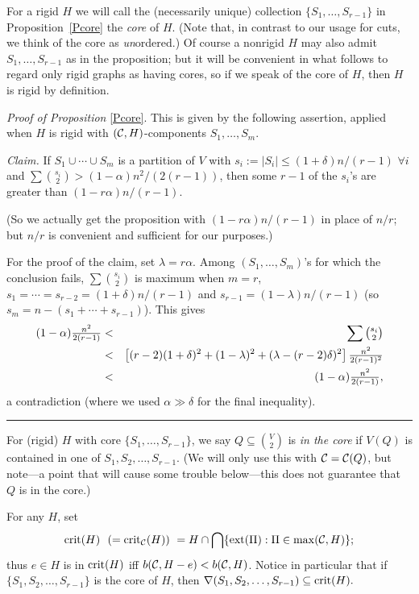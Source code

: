 \documentclass[letterpaper,11pt]{article}
\newcommand{\beq}[1]{\begin{equation}\label{#1}}
\newcommand{\enq}[0]{\end{equation}}
\newcommand{\mn}[0]{\medskip\noindent}
\newcommand{\sub}[0]{\subseteq}
\renewcommand{\dots}[0]{,\ldots,}
\newcommand{\cee}[0]{{\cal C}}
\newcommand{\crit}[0]{{\rm crit}}
\newcommand{\ext}[0]{{\rm ext}}
\newcommand{\0}[0]{\emptyset}
\renewcommand{\qed}[0]{\begin{flushright} \rule{2mm}{3mm} \end{flushright}}
\newcommand{\C}[2]{{{#1}\choose{{#2}}}}
\newcommand{\Cc}[0]{\tbinom}
\newcommand{\ga}[0]{\alpha }
\newcommand{\gd}[0]{\delta }
\newcommand{\gl}[0]{\lambda }
\begin{document}
For a rigid $H$ we will call the (necessarily unique)
collection $\{S_1\dots S_{r-1}\}$ in Proposition~\ref{Pcore}
the {\em core} of $H$.
(Note that, in contrast to our usage for cuts, we
think of the core as {\em un}ordered.)
Of course a nonrigid $H$ may also admit
$S_1\dots S_{r-1}$ as in the proposition; but it
will be convenient in what follows to regard only rigid graphs
as having cores, so if we speak of the core of $H$,
then $H$ is rigid by definition.

\mn
{\em Proof of Proposition} \ref{Pcore}.
This is given by the following assertion,
applied when $H$ is rigid with $(\cee,H)$-components
$S_1\dots S_m$.
%

\mn
{\em Claim.}
If $S_1\cup\cdots\cup S_m$ is a partition of $V$
with $s_i:=|S_i|\leq (1+\gd)n/(r-1)$ $\forall i$ and
$\sum\C{s_i}{2} > (1-\ga)n^2/(2(r-1))$, then
some $r-1$ of the $s_i$'s are greater than
$(1-r\ga)n/(r-1)$.

\mn
(So we actually get
the proposition with $(1-r\ga)n/(r-1)$ in place of $n/r$;
but $n/r$ is convenient and
sufficient for our purposes.)

\medskip
For the proof of the claim, set $\gl=r\ga$.
Among $(S_1\dots S_m)$'s for which
the conclusion fails,
$\sum\C{s_i}{2}$ is maximum when $m=r$,
$s_1=\cdots =s_{r-2}=(1+\gd)n/(r-1)$ and
$s_{r-1}=(1-\gl)n/(r-1)$ (so $s_m= n-(s_1+\cdots +s_{r-1})$).
This gives
\begin{eqnarray*}
(1-\ga)\tfrac{n^2}{2(r-1)} &<&\sum\Cc{s_i}{2}\\
&<& \left[(r-2)(1+\gd)^2 + (1-\gl)^2 + (\gl-(r-2)\gd)^2\right]
\tfrac{n^2}{2(r-1)^2}\\
&<& (1-\ga)
\tfrac{n^2}{2(r-1)},
\end{eqnarray*}
a contradiction
(where we used $\ga \gg \gd$
for the final inequality).\qed


For (rigid) $H$ with core $\{S_1\dots S_{r-1}\}$,
we say $Q\sub \C{V}{2}$ is {\em in the core}
if $V(Q)$ is contained in
one of $S_1,S_2,\ldots, S_{r-1}$.
(We will only use this with $\cee=\cee(Q)$, but note---a
point that will cause some trouble below---this
does not guarantee that
$Q$ is in the core.)

For any $H$, set
\beq{crit}
\crit(H)~~ (=\crit_\cee(H))~ =
H\cap \bigcap \{\ext(\Pi):\Pi\in \max(\cee,H)\};
\enq
thus $e\in H$ is in $\crit(H)$ iff $b(\cee, H-e)< b(\cee,H)$.
Notice in particular that if $\{S_1,S_2,\ldots, S_{r-1}\}$
is the core of $H$, then
$ %
\nabla(S_1,S_2,\ldots, S_{r-1})\sub \crit(H).
$ %
\end{document}
